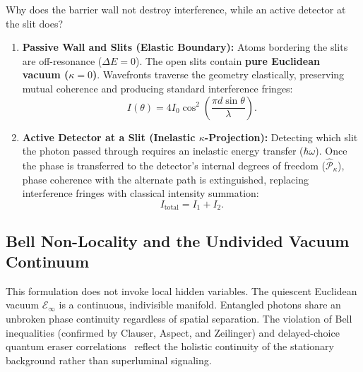 Why does the barrier wall not destroy interference, while an active detector at the slit does?
\begin{enumerate}
    \item \textbf{Passive Wall and Slits (Elastic Boundary):} Atoms bordering the slits are off-resonance ($\Delta E = 0$). The open slits contain \textbf{pure Euclidean vacuum ($\kappa = 0$)}. Wavefronts traverse the geometry elastically, preserving mutual coherence and producing standard interference fringes:
          \begin{equation}
              I(\theta) = 4 I_0 \cos^2\left( \frac{\pi d \sin\theta}{\lambda} \right).
              \label{eq:girisim_sacagi_main}
          \end{equation}
    \item \textbf{Active Detector at a Slit (Inelastic $\kappa$-Projection):} Detecting which slit the photon passed through requires an inelastic energy transfer ($\hbar\omega$). Once the phase is transferred to the detector's internal degrees of freedom ($\hat{\mathcal{P}}_\kappa$), phase coherence with the alternate path is extinguished, replacing interference fringes with classical intensity summation:
          \begin{equation}
              I_{\mathrm{total}} = I_1 + I_2.
              \label{eq:klasik_toplam}
          \end{equation}
\end{enumerate}

\subsection{Bell Non-Locality and the Undivided Vacuum Continuum}
\label{sec:bell_ve_nonlokalite}

This formulation does not invoke local hidden variables. The quiescent Euclidean vacuum $\mathcal{E}_\infty$ is a continuous, indivisible manifold. Entangled photons share an unbroken phase continuity regardless of spatial separation. The violation of Bell inequalities (confirmed by Clauser, Aspect, and Zeilinger) and delayed-choice quantum eraser correlations~\cite{scully1982,kim2000} reflect the holistic continuity of the stationary background rather than superluminal signaling.

